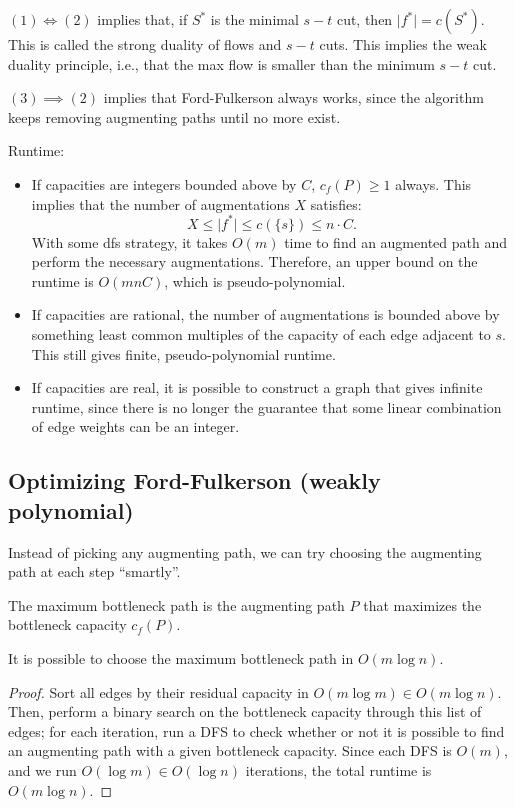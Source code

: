 $(1)\iff (2)$ implies that, if $S^*$ is the minimal $s-t$ cut, then $\vert f^*\vert = c(S^*)$. This is called the \ac{strong duality} of flows and $s-t$ cuts. This implies the weak duality principle, i.e., that the max flow is smaller than the minimum $s-t$ cut. 

$(3)\implies (2)$ implies that Ford-Fulkerson always works, since the algorithm keeps removing augmenting paths until no more exist. \V

Runtime:
\begin{itemize}
    \item If capacities are integers bounded above by $C$, $c_f(P)\geq 1$ always. This implies that the number of augmentations $X$ satisfies: 
    \[X\leq \vert f^*\vert \leq c(\{s\})\leq n\cdot C.\]
    With some dfs strategy, it takes $O(m)$ time to find an augmented path and perform the necessary augmentations. Therefore, an upper bound on the runtime is $O(mnC)$, which is \ac{pseudo-polynomial}. 
    \item If capacities are rational, the number of augmentations is bounded above by something least common multiples of the capacity of each edge adjacent to $s$. This still gives finite, pseudo-polynomial runtime.
    \item If capacities are real, it is possible to construct a graph that gives infinite runtime, since there is no longer the guarantee that some linear combination of edge weights can be an integer. 
\end{itemize}

\subsection{Optimizing Ford-Fulkerson (weakly polynomial)}

Instead of picking any augmenting path, we can try choosing the augmenting path at each step ``smartly''. 

\begin{definition}

The \ac{maximum bottleneck path} is the augmenting path $P$ that maximizes the bottleneck capacity $c_f(P)$. 
\end{definition}

\begin{theorem}
\claimlabel

It is possible to choose the maximum bottleneck path in $O(m\log n)$. 
\end{theorem}

\begin{proof}
Sort all edges by their residual capacity in $O(m\log m)\in O(m\log n)$. Then, perform a binary search on the bottleneck capacity through this list of edges; for each iteration, run a DFS to check whether or not it is possible to find an augmenting path with a given bottleneck capacity. Since each DFS is $O(m)$, and we run $O(\log m)\in O(\log n)$ iterations, the total runtime is $O(m\log n)$. 
\end{proof}

